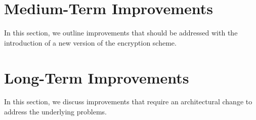 \documentclass[a4paper, 11pt]{article}
\begin{document}
\section{Medium-Term Improvements} \label{sec:midterm} %
  In this section, we outline improvements that should be addressed with the introduction of a new version of the encryption scheme.
  
  
  

\section{Long-Term Improvements} \label{sec:longterm} %
  In this section, we discuss improvements that require an architectural change to address the underlying problems.
  
  
  




\printbibliography

\end{document}
